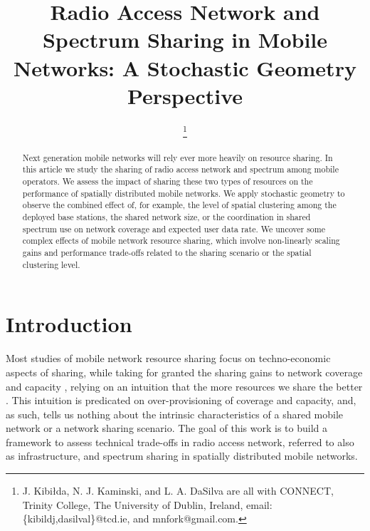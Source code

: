 \documentclass[12pt, journal,doublecolumn, final]{IEEEtran}
\begin{document}
\title{Radio Access Network and Spectrum Sharing in Mobile Networks: A Stochastic Geometry Perspective}

\author{

\thanks{J. Kibi\l{}da, N. J. Kaminski, and L. A. DaSilva are all with CONNECT, Trinity College, The University of Dublin, Ireland, email:  \{kibildj,dasilval\}@tcd.ie, and mnfork@gmail.com.}\vspace*{-0.5cm}}

\maketitle




\begin{abstract}

Next generation mobile networks will rely ever more heavily on resource sharing. In this article we study the sharing of radio access network and spectrum among mobile operators. We assess the impact of sharing these two types of resources on the performance of spatially distributed mobile networks. We apply stochastic geometry to observe the combined effect of, for example, the level of spatial clustering among the deployed base stations, the shared network size, or the coordination in shared spectrum use on network coverage and expected user data rate. We uncover some complex effects of mobile network resource sharing, which involve non-linearly scaling gains and performance trade-offs related to the sharing scenario or the spatial clustering level.

\end{abstract}

\section{Introduction}

Most studies of mobile network resource sharing focus on techno-economic aspects of sharing, while taking for granted the sharing gains to network coverage and capacity \cite{FrisancoTafertshoferLurinAng_2008,MeddourRasheedGourhant_2011}, relying on an intuition that the more resources we share the better \cite{EC_2012}. This intuition is predicated on over-provisioning of coverage and capacity, and, as such, tells us nothing about the intrinsic characteristics of a shared mobile network or a network sharing scenario. The goal of this work is to build a framework to assess technical trade-offs in radio access network, referred to also as infrastructure, and spectrum sharing in spatially distributed mobile networks.
\end{document}
